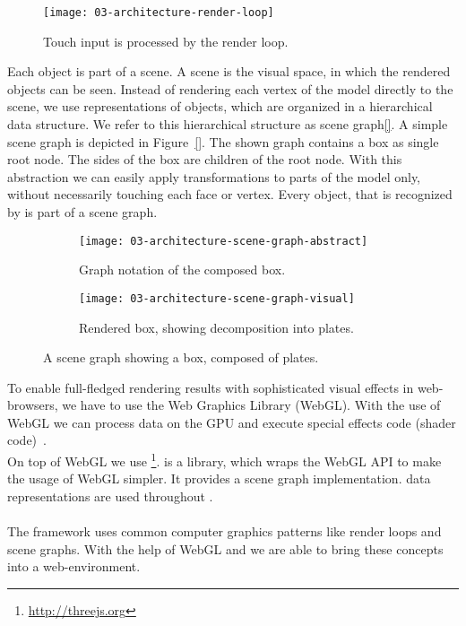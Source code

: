 \documentclass[../ClassicThesis.tex]{subfiles}
\begin{document}
\begin{figure}[h]
  \centering
  \texttt{[image: 03-architecture-render-loop]}
  \caption{Touch input is processed by the render loop.}
  \label{fig:render-loop}
\end{figure}

Each object is part of a scene. A scene is the visual space, in which
the rendered objects can be seen. Instead of rendering each vertex of
the model directly to the scene, we use representations of objects,
which are organized in a hierarchical data structure. We refer to this
hierarchical structure as scene graph\ref{}. A simple scene graph is depicted in
Figure~\ref{}. The shown graph contains a box as single root node. The
sides of the box are children of the root node. With this abstraction
we can easily apply transformations to parts of the model only,
without necessarily touching each face or vertex. Every object, that
is recognized by {\convertify} is part of a scene graph.

\begin{figure}[H]
  \centering
  \begin{subfigure}[b]{0.49\textwidth}
    \centering
    \texttt{[image: 03-architecture-scene-graph-abstract]}
    \caption{Graph notation of the composed box.}
    \label{fig:scene-graph:abstract}
  \end{subfigure}
  \begin{subfigure}[b]{0.49\textwidth}
    \centering
    \texttt{[image: 03-architecture-scene-graph-visual]}
    \caption{Rendered box, showing decomposition into plates.}
    \label{fig:scene-graph:visual}
  \end{subfigure}
  \caption{A scene graph showing a box, composed of plates.}
  \label{fig:scene-graph}
\end{figure}

To enable full-fledged rendering results with sophisticated visual
effects in web-browsers, we have to use the Web Graphics Library
(WebGL). With the use of WebGL we can process data on the GPU and
execute special effects code (shader code)~\cite{mdn-webgl}.
\\
On top of WebGL we use {\threejs}\footnote{\url{http://threejs.org}}.
{\threejs} is a {\javascript} library, which wraps the WebGL API to
make the usage of WebGL simpler. It provides a scene graph
implementation. {\threejs}
data representations are used throughout {\convertify}.\\
\\
The framework {\convertify} uses common computer graphics patterns
like render loops and scene graphs. With the help of WebGL and
{\threejs} we are able to bring these concepts into a web-environment.
\end{document}
